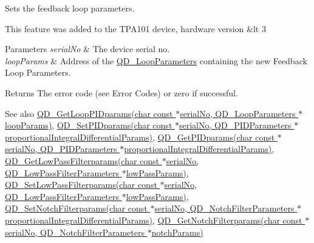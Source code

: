 Sets the feedback loop parameters. 

This feature was added to the T\+P\+A101 device, hardware version \&lt 3


\begin{DoxyParams}{Parameters}
{\em serial\+No} & The device serial no. \\
\hline
{\em loop\+Params} & Address of the \hyperlink{struct_q_d___loop_parameters}{Q\+D\+\_\+\+Loop\+Parameters} containing the new Feedback Loop Parameters. \\
\hline
\end{DoxyParams}
\begin{DoxyReturn}{Returns}
The error code (see Error Codes) or zero if successful. 
\end{DoxyReturn}
\begin{DoxySeeAlso}{See also}
\hyperlink{group___t_cube_quad_ga9dfc01ca4b37b2f0c662b8d8def06e73}{Q\+D\+\_\+\+Get\+Loop\+P\+I\+Dparams(char const $\ast$serial\+No, Q\+D\+\_\+\+Loop\+Parameters $\ast$loop\+Params)}, \hyperlink{group___t_cube_quad_gac4cc242d12537c25f48b86e73138c3d1}{Q\+D\+\_\+\+Set\+P\+I\+Dparams(char const $\ast$serial\+No, Q\+D\+\_\+\+P\+I\+D\+Parameters $\ast$proportional\+Integral\+Differential\+Params)}, \hyperlink{group___t_cube_quad_ga2e1be6be7d8bb5c822766a44205889ae}{Q\+D\+\_\+\+Get\+P\+I\+Dparams(char const $\ast$serial\+No, Q\+D\+\_\+\+P\+I\+D\+Parameters $\ast$proportional\+Integral\+Differential\+Params)}, \hyperlink{group___t_cube_quad_ga698c72e36ea50417955b08b69215fcf5}{Q\+D\+\_\+\+Get\+Low\+Pass\+Filterparams(char const $\ast$serial\+No, Q\+D\+\_\+\+Low\+Pass\+Filter\+Parameters $\ast$low\+Pass\+Params)}, \hyperlink{group___t_cube_quad_ga2e8b2f659d9008af335d876976450bc5}{Q\+D\+\_\+\+Set\+Low\+Pass\+Filterparams(char const $\ast$serial\+No, Q\+D\+\_\+\+Low\+Pass\+Filter\+Parameters $\ast$low\+Pass\+Params)}, \hyperlink{group___t_cube_quad_ga00572c166108d5bd60ed0ab5eae7d83c}{Q\+D\+\_\+\+Set\+Notch\+Filterparams(char const $\ast$serial\+No, Q\+D\+\_\+\+Notch\+Filter\+Parameters $\ast$proportional\+Integral\+Differential\+Params)}, \hyperlink{group___t_cube_quad_ga5132ce023e2c0248a42cb5cdf0a95c3e}{Q\+D\+\_\+\+Get\+Notch\+Filterparams(char const $\ast$serial\+No, Q\+D\+\_\+\+Notch\+Filter\+Parameters $\ast$notch\+Params)}


\end{DoxySeeAlso}
